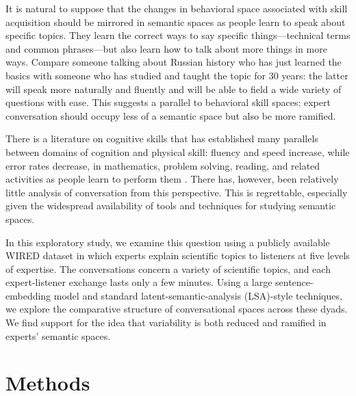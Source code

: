 \documentclass{article}
\begin{document}
It is natural to suppose that the changes in behavioral space associated with skill acquisition should be mirrored in semantic spaces as people learn to speak about specific topics. They learn the correct ways to say specific things---technical terms and common phrases---but also learn how to talk about more things in more ways. Compare someone talking about Russian history who has just learned the basics with someone who has studied and taught the topic for 30 years: the latter will speak more naturally and fluently and will be able to field a wide variety of questions with ease. This suggests a parallel to behavioral skill spaces: expert conversation should occupy less of a semantic space but also be more ramified.

There is a literature on cognitive skills that has established many parallels between domains of cognition and physical skill: fluency and speed increase, while error rates decrease, in mathematics, problem solving, reading, and related activities as people learn to perform them \citep{groot_thought_1965,robinson_mathematical_1978,egan_chunking_1979,chi1981expertise}. There has, however, been relatively little analysis of conversation from this perspective. This is regrettable, especially given the widespread availability of tools and techniques for studying semantic spaces.

In this exploratory study, we examine this question using a publicly available WIRED dataset in which experts explain scientific topics to listeners at five levels of expertise. The conversations concern a variety of scientific topics, and each expert-listener exchange lasts only a few minutes. Using a large sentence-embedding model and standard latent-semantic-analysis (LSA)-style techniques, we explore the comparative structure of conversational spaces across these dyads. We find support for the idea that variability is both reduced and ramified in experts' semantic spaces.


\section{Methods}
\end{document}
